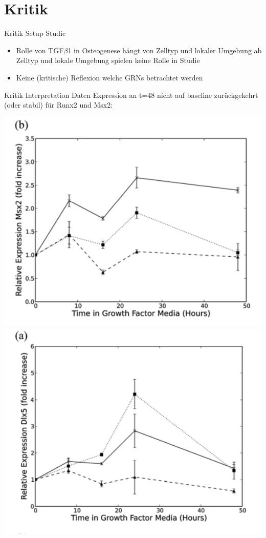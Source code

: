 \documentclass[]{beamer}
\begin{document}
\section{Kritik}

\begin{frame}{Kritik Setup Studie}
\begin{itemize}
	\item Rolle von TGF$\beta$1 in Osteogenese h\"angt von Zelltyp und lokaler Umgebung ab
	\\ Zelltyp und lokale Umgebung spielen keine Rolle in Studie
	\pause
	\item Keine (kritische) Reflexion welche GRNs betrachtet werden
\end{itemize}
\end{frame}

\begin{frame}{Kritik Interpretation Daten}
	Expression an t=48 nicht auf baseline zur\"uckgekehrt (oder stabil) f\"ur Runx2 und Msx2:
	\\
\begin{center}
			\includegraphics[scale=0.18]{Expression_Msx2.jpg}
			\includegraphics[scale=0.18]{Expression_Dlx5.jpg}

\end{center}
\end{frame}
\end{document}
